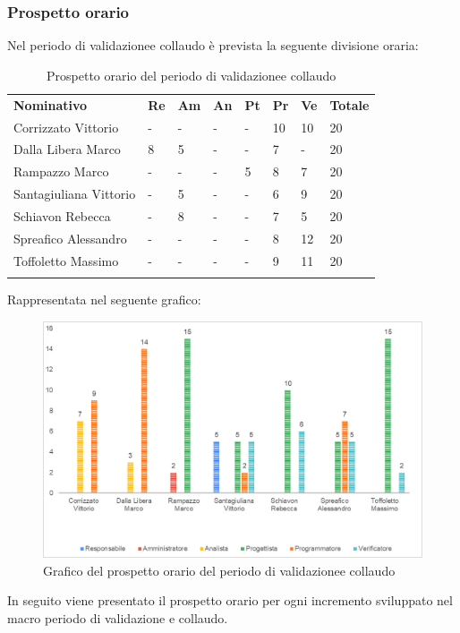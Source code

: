 \subsubsection{Prospetto orario}
Nel periodo di validazione\glosp e collaudo è prevista la seguente divisione oraria:
\begin{longtable} {				
		>{}p{40mm}  
		>{}p{8mm}
		>{}p{8mm}
		>{}p{8mm}
		>{}p{8mm}
		>{}p{8mm}
		>{}p{8mm}
		>{}p{12mm}			
	}			
	\rowcolor{gray!50}
	\textbf{Nominativo} & \textbf{Re} & \textbf{Am} & \textbf{An} & \textbf{Pt} & \textbf{Pr} & \textbf{Ve} & \textbf{Totale}	\TBstrut \\ [2mm]
	Corrizzato Vittorio & - & - & - & - & 10 & 10 & 20 \TBstrut \\ [2mm]
	Dalla Libera Marco & 8 & 5 & - & - & 7 & - & 20 \TBstrut \\ [2mm]
	Rampazzo Marco & - & - & - & 5 & 8 & 7 & 20 \TBstrut \\ [2mm]
	Santagiuliana Vittorio & - & 5 & - & - & 6 & 9 & 20 \TBstrut \\ [2mm]
	Schiavon Rebecca & - & 8 & - & - & 7 & 5 & 20 \TBstrut \\ [2mm]
	Spreafico Alessandro & - & - & - & - & 8 & 12 & 20 \TBstrut \\ [2mm]
	Toffoletto Massimo & - & - & - & - & 9 & 11 & 20 \TBstrut \\ [2mm]
	\rowcolor{white}
	\caption{Prospetto orario del periodo di validazione\glosp e collaudo}
\end{longtable}
Rappresentata nel seguente grafico:
\begin{figure} [H]
	\includegraphics[width=\linewidth]{./img/Grafici/17.png}
	\caption{Grafico del prospetto orario del periodo di validazione\glosp e collaudo}
\end{figure}
In seguito viene presentato il prospetto orario per ogni incremento sviluppato nel macro periodo di validazione e collaudo.
